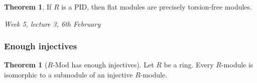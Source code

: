 \documentclass{article}
\theoremstyle{definition}
\newtheorem{thm}[defn]{Theorem}
\begin{document}
\begin{thm}
\label{thm:flatistorsionfreeoverPID}
If $R$ is a PID, then flat modules are precisely torsion-free modules.
\end{thm}

\begin{flushright}
\textit{Week 5, lecture 3, 6th February}
\end{flushright}

\subsubsection{Enough injectives}
\begin{thm}[$R$-Mod has enough injectives]
\label{thm:enoughinjectives}
Let $R$ be a ring. Every $R$-module is isomorphic to a submodule of an injective $R$-module.
\end{thm}
\end{document}
